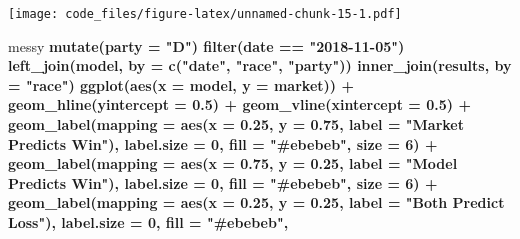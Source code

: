 \documentclass[]{article}
\newenvironment{Shaded}{\begin{snugshade}}{\end{snugshade}}
\newcommand{\DataTypeTok}[1]{\textcolor[rgb]{0.13,0.29,0.53}{#1}}
\newcommand{\DecValTok}[1]{\textcolor[rgb]{0.00,0.00,0.81}{#1}}
\newcommand{\FloatTok}[1]{\textcolor[rgb]{0.00,0.00,0.81}{#1}}
\newcommand{\KeywordTok}[1]{\textcolor[rgb]{0.13,0.29,0.53}{\textbf{#1}}}
\newcommand{\NormalTok}[1]{#1}
\newcommand{\OperatorTok}[1]{\textcolor[rgb]{0.81,0.36,0.00}{\textbf{#1}}}
\newcommand{\StringTok}[1]{\textcolor[rgb]{0.31,0.60,0.02}{#1}}
\begin{document}
\texttt{[image: code\_files/figure-latex/unnamed-chunk-15-1.pdf]}

\begin{Shaded}
\begin{Highlighting}[]
\NormalTok{messy }\OperatorTok{%>%}
\StringTok{  }\KeywordTok{mutate}\NormalTok{(}\DataTypeTok{party =} \StringTok{"D"}\NormalTok{) }\OperatorTok{%>%}
\StringTok{  }\KeywordTok{filter}\NormalTok{(date }\OperatorTok{==}\StringTok{ "2018-11-05"}\NormalTok{) }\OperatorTok{%>%}
\StringTok{  }\KeywordTok{left_join}\NormalTok{(model, }\DataTypeTok{by =} \KeywordTok{c}\NormalTok{(}\StringTok{"date"}\NormalTok{, }\StringTok{"race"}\NormalTok{, }\StringTok{"party"}\NormalTok{)) }\OperatorTok{%>%}
\StringTok{  }\KeywordTok{inner_join}\NormalTok{(results, }\DataTypeTok{by =} \StringTok{"race"}\NormalTok{) }\OperatorTok{%>%}
\StringTok{  }\KeywordTok{ggplot}\NormalTok{(}\KeywordTok{aes}\NormalTok{(}\DataTypeTok{x  =}\NormalTok{ model, }\DataTypeTok{y  =}\NormalTok{ market)) }\OperatorTok{+}
\StringTok{  }\KeywordTok{geom_hline}\NormalTok{(}\DataTypeTok{yintercept =} \FloatTok{0.5}\NormalTok{) }\OperatorTok{+}
\StringTok{  }\KeywordTok{geom_vline}\NormalTok{(}\DataTypeTok{xintercept =} \FloatTok{0.5}\NormalTok{) }\OperatorTok{+}
\StringTok{  }\KeywordTok{geom_label}\NormalTok{(}\DataTypeTok{mapping =} \KeywordTok{aes}\NormalTok{(}\DataTypeTok{x =} \FloatTok{0.25}\NormalTok{, }\DataTypeTok{y =} \FloatTok{0.75}\NormalTok{, }\DataTypeTok{label =} \StringTok{"Market Predicts Win"}\NormalTok{),}
             \DataTypeTok{label.size =} \DecValTok{0}\NormalTok{,}
             \DataTypeTok{fill =} \StringTok{"#ebebeb"}\NormalTok{,}
             \DataTypeTok{size =} \DecValTok{6}\NormalTok{) }\OperatorTok{+}
\StringTok{  }\KeywordTok{geom_label}\NormalTok{(}\DataTypeTok{mapping =} \KeywordTok{aes}\NormalTok{(}\DataTypeTok{x =} \FloatTok{0.75}\NormalTok{, }\DataTypeTok{y =} \FloatTok{0.25}\NormalTok{, }\DataTypeTok{label =} \StringTok{"Model Predicts Win"}\NormalTok{),}
             \DataTypeTok{label.size =} \DecValTok{0}\NormalTok{,}
             \DataTypeTok{fill =} \StringTok{"#ebebeb"}\NormalTok{,}
             \DataTypeTok{size =} \DecValTok{6}\NormalTok{) }\OperatorTok{+}
\StringTok{  }\KeywordTok{geom_label}\NormalTok{(}\DataTypeTok{mapping =} \KeywordTok{aes}\NormalTok{(}\DataTypeTok{x =} \FloatTok{0.25}\NormalTok{, }\DataTypeTok{y =} \FloatTok{0.25}\NormalTok{, }\DataTypeTok{label =} \StringTok{"Both Predict Loss"}\NormalTok{),}
             \DataTypeTok{label.size =} \DecValTok{0}\NormalTok{,}
             \DataTypeTok{fill =} \StringTok{"#ebebeb"}\NormalTok{,}
}}}}}
\end{Highlighting}
\end{Shaded}
\end{document}
